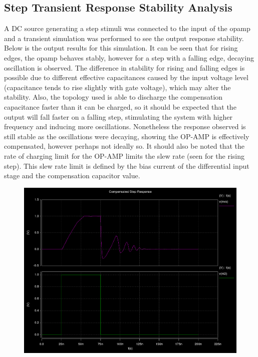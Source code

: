 \documentclass[12pt]{article}
\begin{document}
\subsection*{Step Transient Response Stability Analysis}
A DC source generating a step stimuli was connected to the input of the opamp and a transient simulation was performed to see the output response stability. Below is the output results for this simulation. It can be seen that for rising edges, the opamp behaves stably, however for a step with a falling edge, decaying oscillation is observed. The difference in stability for rising and falling edges is possible due to different effective capacitances caused by the input voltage level (capacitance tends to rise slightly with gate voltage), which may alter the stability. Also, the topology used is able to discharge the compensation capacitance faster than it can be charged, so it should be expected that the output will fall faster on a falling step, stimulating the system with higher frequency and inducing more oscillations. Nonetheless the response observed is still stable as the oscillations were decaying, showing the OP-AMP is effectively compensated, however perhaps not ideally so. It should also be noted that the rate of charging limit for the OP-AMP limits the slew rate (seen for the rising step). This slew rate limit is defined by the bias current of the differential input stage and the compensation capacitor value.
\begin{figure}[h!] 
\begin{center}
 \includegraphics[scale=0.3]{./steppn.png}
\end{center}
\end{figure}
\FloatBarrier
\end{document}
